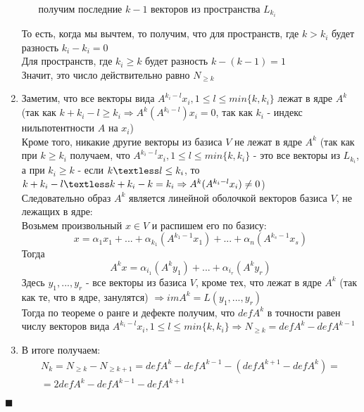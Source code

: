 \documentclass[a4paper,12pt,titlepage,final]{article}
\begin{document}
\begin{enumerate}
\begin{itemize}
        получим последние $k - 1$ векторов из пространства $L_{k_i}$
    \end{itemize}
    То есть, когда мы вычтем, то получим, что для пространств, где $k > k_i$ будет разность $k_i - k_i = 0$ \\
    Для пространств, где $k_i \geq k$ будет разность $k - (k - 1) = 1$ \\
    Значит, это число действительно равно $N_{\geq k}$
    \item Заметим, что все векторы вида $A^{k_i - l}x_i, 1 \leq l \leq min\{k, k_i\}$ лежат в ядре $A^k$ (так как 
    $k + k_i - l \geq k_i \Rightarrow A^k (A^{k_i - l})x_i = 0$, так как $k_i$ - индекс нильпотентности $A$ на $x_i$) \\
    Кроме того, никакие другие векторы из базиса $V$ не лежат в ядре $A^k$ (так как при $k \ge k_i$ получаем, что $A^{k_i - l}x_i, 1 \leq l \leq min\{k, k_i\}$
     - это все векторы из $L_{k_i}$, а при $k_i \geq k$ - если $k \textless l \leq k_i$, то $k + k_i - l \textless 
     k + k_i - k = k_i \Rightarrow A^k(A^{k_i - l}x_i) \neq 0$) \\
    Следовательно образ $A^k$ является линейной оболочкой векторов базиса $V$, не лежащих в ядре: \\
    Возьмем произвольный $x \in V$ и распишем его по базису: \\
    $$x = \alpha_1 x_1 + ... + \alpha_{k_1}(A^{k_1 - 1}x_1) + ... + \alpha_n (A^{k_s - 1}x_s)$$
    Тогда $$A^k x = \alpha_{i_1}(A^k y_1) + ... + \alpha_{i_r}(A^k y_r)$$
    Здесь $y_1, ... , y_r$ - все векторы из базиса $V$, кроме тех, что лежат в ядре $A^k$ (так как те, что в ядре, занулятся) $\Rightarrow imA^k = L(y_1, ... , y_r)$ \\
    Тогда по теореме о ранге и дефекте получим, что $defA^k$ в точности равен числу векторов вида $A^{k_i - l}x_i, 1 \leq l \leq min\{k, k_i\} \Rightarrow N_{\geq k} = defA^k - defA^{k - 1}$
    \item В итоге получаем:
    \begin{gather*}
        N_k = N_{\geq k} - N_{\geq k + 1} = defA^k - defA^{k - 1} - (defA^{k + 1} - defA^k) = \\
        = 2defA^k - defA^{k - 1} - defA^{k + 1}
    \end{gather*}
\end{enumerate}
$\blacksquare$ \\ \\ \\
\end{document}
